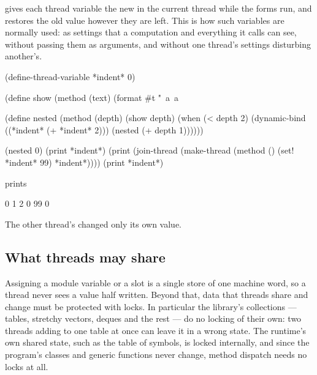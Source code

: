 \begin{quote}
\end{quote}

\noindent gives each thread variable  the new  in
the current thread while the forms run, and restores the old value
however they are left. This is how such variables are normally used: as
settings that a computation and everything it calls can see, without
passing them as arguments, and without one thread's settings disturbing
another's.

\begin{dylan}
(define-thread-variable *indent* 0)

(define show
  (method (text)
    (format #t "~a~a~%

(define nested
  (method (depth)
    (show depth)
    (when (< depth 2)
      (dynamic-bind ((*indent* (+ *indent* 2)))
        (nested (+ depth 1))))))

(nested 0)
(print *indent*)
(print (join-thread (make-thread (method () (set! *indent* 99) *indent*))))
(print *indent*)
\end{dylan}

\noindent prints

\begin{dylan}
0
  1
    2
0
99
0
\end{dylan}

The other thread's  changed only its own value.

\subsection{What threads may share}\label{sec:ext-thread-sharing}

Assigning a module variable or a slot is a single store of one machine
word, so a thread never sees a value half written. Beyond that, data
that threads share and change must be protected with locks. In
particular the library's collections --- tables, stretchy vectors,
deques and the rest --- do no locking of their own: two threads adding to
one table at once can leave it in a wrong state. The runtime's own shared state, such as the table of
symbols, is locked internally, and since the program's classes and
generic functions never change, method dispatch needs no locks at all.

\fussy
